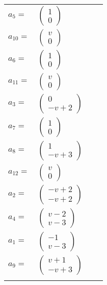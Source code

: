\documentclass[1p]{elsarticle_modified}
\theoremstyle{definition}
\begin{document}
\begin{tabular}{m{7pt} m{180pt} m{7pt} m{180pt} }
\flushright $a_{5}=$&$\begin{pmatrix}1\\0\end{pmatrix}$ \\
\flushright $a_{10}=$&$\begin{pmatrix}v\\0\end{pmatrix}$ \\
\flushright $a_{6}=$&$\begin{pmatrix}1\\0\end{pmatrix}$ \\
\flushright $a_{11}=$&$\begin{pmatrix}v\\0\end{pmatrix}$ \\
\flushright $a_{3}=$&$\begin{pmatrix}0\\- v+2\end{pmatrix}$ \\
\flushright $a_{7}=$&$\begin{pmatrix}1\\0\end{pmatrix}$ \\
\flushright $a_{8}=$&$\begin{pmatrix}1\\- v+3\end{pmatrix}$ \\
\flushright $a_{12}=$&$\begin{pmatrix}v\\0\end{pmatrix}$ \\
\flushright $a_{2}=$&$\begin{pmatrix}- v+2\\- v+2\end{pmatrix}$ \\
\flushright $a_{4}=$&$\begin{pmatrix}v-2\\v-3\end{pmatrix}$ \\
\flushright $a_{1}=$&$\begin{pmatrix}-1\\v-3\end{pmatrix}$ \\
\flushright $a_{9}=$&$\begin{pmatrix}v+1\\- v+3\end{pmatrix}$\\&\end{tabular}
\end{document}
